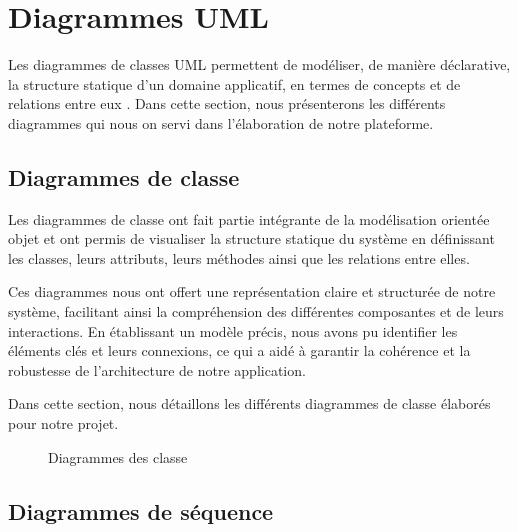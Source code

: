 \section{Diagrammes UML}
Les diagrammes de classes UML permettent de modéliser, de manière déclarative, la structure statique d'un domaine applicatif, en termes de concepts et de relations entre eux \cite{berardi2005reasoning}. 
Dans cette section, nous présenterons les différents diagrammes qui nous on servi dans l'élaboration de notre plateforme. 

\subsection{Diagrammes de classe}
Les diagrammes de classe ont fait partie intégrante de la modélisation orientée objet et ont permis de visualiser la structure statique du système en définissant les classes, leurs attributs, leurs méthodes ainsi que les relations entre elles.\par

Ces diagrammes nous ont offert une représentation claire et structurée de notre système, facilitant ainsi la compréhension des différentes composantes et de leurs interactions. En établissant un modèle précis, nous avons pu identifier les éléments clés et leurs connexions, ce qui a aidé à garantir la cohérence et la robustesse de l'architecture de notre application.\par

Dans cette section, nous détaillons les différents diagrammes de classe élaborés pour notre projet.\par

	\begin{figure}[H]%
    \center%
    \setlength{\fboxsep}{5pt}%
    \setlength{\fboxrule}{0.5pt}%
    \caption{Diagrammes des classe}%
\end{figure} \par
\subsection{Diagrammes de séquence}

